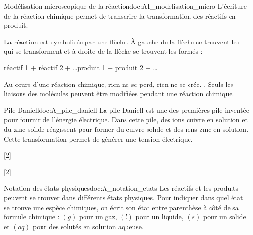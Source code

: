 \begin{doc}{Modélisation microscopique de la réaction}{doc:A1_modelisation_micro}
  L'écriture de la réaction chimique permet de transcrire la transformation des réactifs en produit.
  
  \begin{importants}
    La réaction est symbolisée par une flèche. À gauche de la flèche se trouvent les  qui se transforment et à droite de la flèche se trouvent les  formés :
    \begin{center}
      réactif 1 $+$ réactif 2 $+$ \ldots \reaction produit 1 $+$ produit 2 $+$ \ldots
    \end{center}
  \end{importants}
  
  Au cours d'une réaction chimique, rien ne se perd, rien ne se crée. .
  Seuls les liaisons des molécules peuvent être modifiées pendant une réaction chimique.
\end{doc}

\begin{doc}{Pile Daniell}{doc:A_pile_daniell}
  La pile Daniell est une des premières pile inventée pour fournir de l'énergie électrique.
  Dans cette pile, des ions cuivre  en solution et du zinc solide  réagissent pour former du cuivre solide  et des ions zinc  en solution.
  Cette transformation permet de générer une tension électrique.
\end{doc}

\newpage
\vspace*{-30pt}
[2]

[2]


\begin{doc}{Notation des états physiques}{doc:A_notation_etats}
  Les réactifs et les produits peuvent se trouver dans différents états physiques.
  Pour indiquer dans quel état se trouve une espèce chimiques, on écrit son état entre parenthèse à côté de sa formule chimique : $(g)$ pour un gaz, $(l)$ pour un liquide, $(s)$ pour un solide et $(aq)$ pour des solutés en solution aqueuse.
\end{doc}

